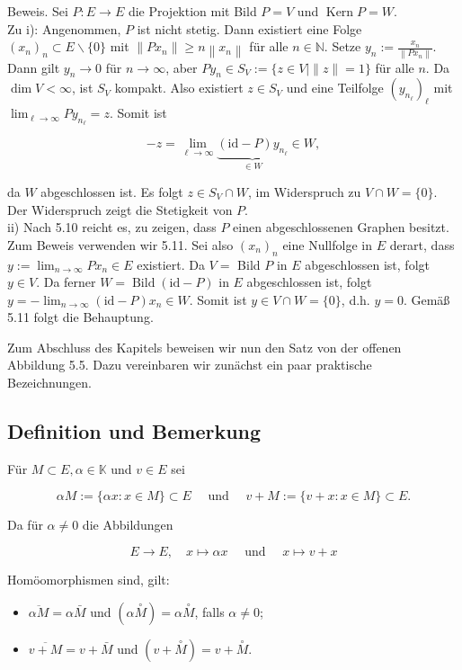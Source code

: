 \documentclass[10pt, letterpaper]{article}
\begin{document}
Beweis. Sei $P: E \rightarrow E$ die Projektion mit Bild $P=V$ und $\operatorname{Kern} P=W$.\\
Zu i): Angenommen, $P$ ist nicht stetig. Dann existiert eine Folge $\left(x_{n}\right)_{n} \subset E \backslash\{0\}$ mit $\left\|P x_{n}\right\| \geq n\left\|x_{n}\right\|$ für alle $n \in \mathbb{N}$. Setze $y_{n}:=\frac{x_{n}}{\left\|P x_{n}\right\|}$. Dann gilt $y_{n} \rightarrow 0$ für $n \rightarrow \infty$, aber $P y_{n} \in S_{V}:=\{z \in V \mid\|z\|=1\}$ für alle $n$. Da $\operatorname{dim} V<\infty$, ist $S_{V}$ kompakt. Also existiert $z \in S_{V}$ und eine Teilfolge $\left(y_{n_{\ell}}\right)_{\ell}$ mit $\lim _{\ell \rightarrow \infty} P y_{n_{\ell}}=z$. Somit ist

$$
-z=\lim _{\ell \rightarrow \infty} \underbrace{(\mathrm{id}-P) y_{n_{\ell}}}_{\in W} \in W,
$$

da $W$ abgeschlossen ist. Es folgt $z \in S_{V} \cap W$, im Widerspruch zu $V \cap W=\{0\}$. Der Widerspruch zeigt die Stetigkeit von $P$.\\
ii) Nach 5.10 reicht es, zu zeigen, dass $P$ einen abgeschlossenen Graphen besitzt. Zum Beweis verwenden wir 5.11. Sei also $\left(x_{n}\right)_{n}$ eine Nullfolge in $E$ derart, dass $y:=\lim _{n \rightarrow \infty} P x_{n} \in E$ existiert. Da $V=$ Bild $P$ in $E$ abgeschlossen ist, folgt $y \in V$. Da ferner $W=\operatorname{Bild}(\mathrm{id}-P)$ in $E$ abgeschlossen ist, folgt $y=-\lim _{n \rightarrow \infty}(\mathrm{id}-P) x_{n} \in W$. Somit ist $y \in V \cap W=\{0\}$, d.h. $y=0$. Gemäß 5.11 folgt die Behauptung.

Zum Abschluss des Kapitels beweisen wir nun den Satz von der offenen Abbildung 5.5. Dazu vereinbaren wir zunächst ein paar praktische Bezeichnungen.

\subsection*{Definition und Bemerkung}
Für $M \subset E, \alpha \in \mathbb{K}$ und $v \in E$ sei

$$
\alpha M:=\{\alpha x: x \in M\} \subset E \quad \text { und } \quad v+M:=\{v+x: x \in M\} \subset E .
$$

Da für $\alpha \neq 0$ die Abbildungen

$$
E \rightarrow E, \quad x \mapsto \alpha x \quad \text { und } \quad x \mapsto v+x
$$

Homöomorphismen sind, gilt:

\begin{itemize}
  \item $\overline{\alpha M}=\alpha \bar{M}$ und $(\alpha \stackrel{\circ}{M})=\alpha \stackrel{\circ}{M}$, falls $\alpha \neq 0$;
  \item $\overline{v+M}=v+\bar{M}$ und $(v+\stackrel{\circ}{M})=v+\stackrel{\circ}{M}$.
\end{itemize}
\end{document}
